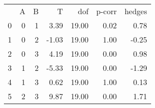 \begin{tabular}{lrrrrrr}
 & A & B & T & dof & p-corr & hedges \\
0 & 0 & 1 & 3.39 & 19.00 & 0.02 & 0.78 \\
1 & 0 & 2 & -1.03 & 19.00 & 1.00 & -0.25 \\
2 & 0 & 3 & 4.19 & 19.00 & 0.00 & 0.98 \\
3 & 1 & 2 & -5.33 & 19.00 & 0.00 & -1.29 \\
4 & 1 & 3 & 0.62 & 19.00 & 1.00 & 0.13 \\
5 & 2 & 3 & 9.87 & 19.00 & 0.00 & 1.71 \\
\end{tabular}
